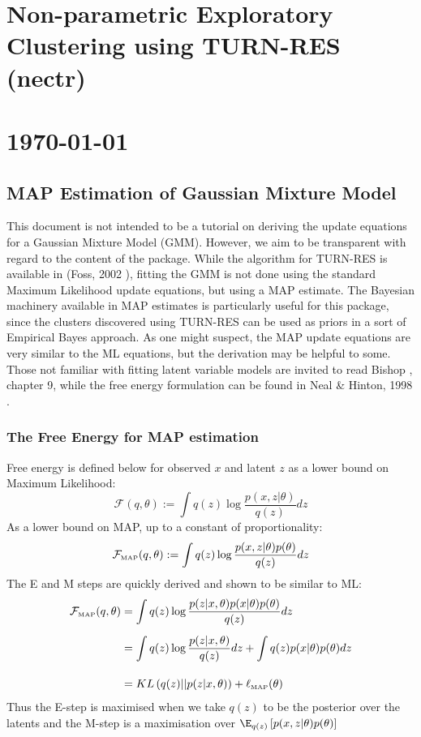 \documentclass[11pt]{article}
\begin{document}
\section*{Non-parametric Exploratory Clustering using TURN-RES (nectr)}
\section*{\today}
\vspace*{20pt}

\subsection{MAP Estimation of Gaussian Mixture Model}
This document is not intended to be a tutorial on deriving the update equations for a Gaussian Mixture Model (GMM). However, we aim to be transparent with regard to the content of the package. While the algorithm for TURN-RES is available in (Foss, 2002 \cite{F02}), fitting the GMM is not done using the standard Maximum Likelihood update equations, but using a MAP estimate. The Bayesian machinery available in MAP estimates is particularly useful for this package, since the clusters discovered using TURN-RES can be used as priors in a sort of Empirical Bayes approach. As one might suspect, the MAP update equations are very similar to the ML equations, but the derivation may be helpful to some. Those not familiar with fitting latent variable models are invited to read Bishop \cite{B06}, chapter 9, while the free energy formulation can be found in Neal \& Hinton, 1998 \cite{N98}.

\subsubsection{The Free Energy for MAP estimation}
Free energy is defined below for observed $x$ and latent $z$ as a lower bound on Maximum Likelihood:
$$ \mathcal{F}(q, \theta) := \int q(z) \log \frac{p(x, z|\theta)}{q(z)}dz $$
As a lower bound on MAP, up to a constant of proportionality:
$$ \mathcal{F}_{\text{\tiny{MAP}}}(q, \theta) := \int q(z) \log \frac{p(x, z|\theta) p(\theta)}{q(z)}dz $$
The E and M steps are quickly derived and shown to be similar to ML:
\begin{align*}
\mathcal{F}_{\text{\tiny{MAP}}}(q, \theta) &=  \int q(z) \log \frac{p(z| x, \theta) p(x |\theta) p(\theta)}{q(z)}dz\\[5pt]
&=  \int q(z) \log \frac{p(z| x, \theta)}{q(z)}dz + \int q(z) p(x |\theta) p(\theta) dz \\[10pt]
&=  KL\left(q(z)||p(z|x,\theta)\right) + \ell_{\text{\tiny{MAP}}}(\theta)
\end{align*}
Thus the E-step is maximised when we take $q(z)$ to be the posterior over the latents and the M-step is a maximisation over $\E_{q(z)} \left[p(x, z|\theta) p(\theta)\right]$
\\[20pt]
\end{document}

